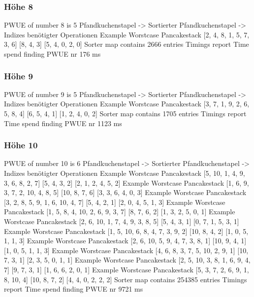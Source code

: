 {    \subsubsection{Höhe 8}

    PWUE of number 8 is 5
    Pfandkuchenstapel -> Sortierter Pfandkuchenstapel -> Indizes benötigter Operationen
Example Worstcase Pancakestack
    [2, 4, 8, 1, 5, 7, 3, 6]
    [8, 4, 3]
    [5, 4, 0, 2, 0]
    Sorter map contains 2666 entries
    Timings report
    Time spend finding PWUE nr 176 ms
    \subsubsection{Höhe 9}

    PWUE of number 9 is 5
    Pfandkuchenstapel -> Sortierter Pfandkuchenstapel -> Indizes benötigter Operationen
Example Worstcase Pancakestack
    [3, 7, 1, 9, 2, 6, 5, 8, 4]
    [6, 5, 4, 1]
    [1, 2, 4, 0, 2]
    Sorter map contains 1705 entries
    Timings report
    Time spend finding PWUE nr 1123 ms
    \subsubsection{Höhe 10}

    PWUE of number 10 is 6
    Pfandkuchenstapel -> Sortierter Pfandkuchenstapel -> Indizes benötigter Operationen
Example Worstcase Pancakestack
    [5, 10, 1, 4, 9, 3, 6, 8, 2, 7]
    [5, 4, 3, 2]
    [2, 1, 2, 4, 5, 2]
    Example Worstcase Pancakestack
    [1, 6, 9, 3, 7, 2, 10, 4, 8, 5]
    [10, 8, 7, 6]
    [3, 3, 6, 4, 0, 3]
    Example Worstcase Pancakestack
    [3, 2, 8, 5, 9, 1, 6, 10, 4, 7]
    [5, 4, 2, 1]
    [2, 0, 4, 5, 1, 3]
    Example Worstcase Pancakestack
    [1, 5, 8, 4, 10, 2, 6, 9, 3, 7]
    [8, 7, 6, 2]
    [1, 3, 2, 5, 0, 1]
    Example Worstcase Pancakestack
    [2, 6, 10, 1, 7, 4, 9, 3, 8, 5]
    [5, 4, 3, 1]
    [0, 7, 1, 5, 3, 1]
    Example Worstcase Pancakestack
    [1, 5, 10, 6, 8, 4, 7, 3, 9, 2]
    [10, 8, 4, 2]
    [1, 0, 5, 1, 1, 3]
    Example Worstcase Pancakestack
    [2, 6, 10, 5, 9, 4, 7, 3, 8, 1]
    [10, 9, 4, 1]
    [1, 0, 5, 1, 1, 3]
    Example Worstcase Pancakestack
    [4, 6, 8, 3, 7, 5, 10, 2, 9, 1]
    [10, 7, 3, 1]
    [2, 3, 5, 0, 1, 1]
    Example Worstcase Pancakestack
    [2, 5, 10, 3, 8, 1, 6, 9, 4, 7]
    [9, 7, 3, 1]
    [1, 6, 6, 2, 0, 1]
    Example Worstcase Pancakestack
    [5, 3, 7, 2, 6, 9, 1, 8, 10, 4]
    [10, 8, 7, 2]
    [4, 4, 0, 2, 2, 2]
    Sorter map contains 254385 entries
    Timings report
    Time spend finding PWUE nr 9721 ms
}
